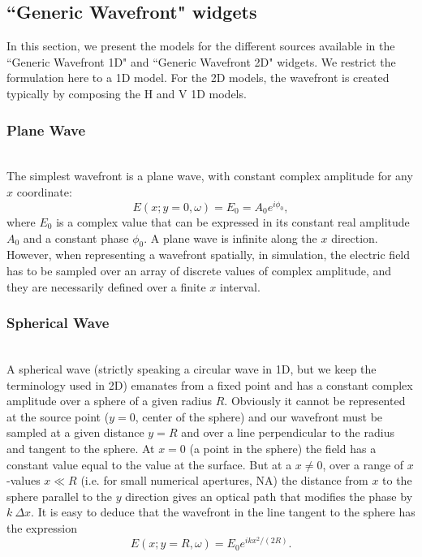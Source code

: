 \documentclass{iopconfser}
\begin{document}
\subsection{``Generic Wavefront" widgets}

In this section, we present the models for the different sources available in the ``Generic Wavefront 1D" and ``Generic Wavefront 2D" widgets. 
We restrict the formulation here to a 1D model. For the 2D models, the wavefront is created typically by composing the H and V 1D models.  

\subsubsection{Plane Wave}\hspace*{\fill} \\
The simplest wavefront is a plane wave, with constant complex amplitude for any $x$ coordinate: 
\begin{equation}
   E(x;y=0,\omega)=E_0=A_0 e^{i \phi_0},
\end{equation}
where $E_0$ is a complex value that can be expressed in its constant real amplitude $A_0$ and a constant phase $\phi_0$. A plane wave is infinite along the $x$ direction. However, when representing a wavefront spatially, in simulation, the electric field has to be sampled over an array of discrete values of complex amplitude, and they are necessarily defined over a finite $x$ interval. 

\subsubsection{Spherical Wave}\hspace*{\fill} \\
A spherical wave (strictly speaking a circular wave in 1D, but we keep the terminology used in 2D) emanates from a fixed point and has a constant complex amplitude over a sphere of a given radius $R$. Obviously it cannot be represented at the source point ($y=0$, center of the sphere) and our wavefront must be sampled at a given distance $y=R$ and over a line perpendicular to the radius and tangent to the sphere. At $x=0$ (a point in the sphere) the field has a constant value equal to the value at the surface. But at a $x{\ne}0$, over a range of $x$-values $x{\ll}R$ (i.e. for small numerical apertures, NA) the distance from $x$ to the sphere parallel to the $y$ direction gives an optical path that modifies the phase by $k ~\Delta x$. It is easy to deduce that the wavefront in the line tangent to the sphere has the expression
\begin{equation}
\label{eq:sphericalWave}
    E(x;y=R,\omega)  = E_0 e^{i k x^2 / (2 R)}.
\end{equation}
\end{document}

